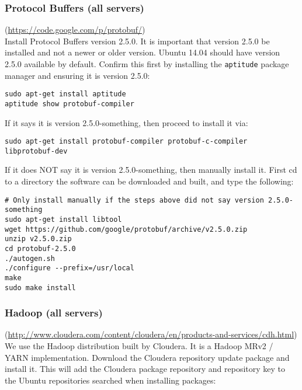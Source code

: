 
\subsubsection{Protocol Buffers (all servers)} (\url{https://code.google.com/p/protobuf/})\\
Install Protocol Buffers version 2.5.0.  It is important that version
2.5.0 be installed and not a newer or older version.  Ubuntu 14.04 should
have version 2.5.0 available by default.  Confirm this first by installing the
\verb|aptitude| package manager and ensuring it is version 2.5.0:

\begin{verbatim}
sudo apt-get install aptitude
aptitude show protobuf-compiler
\end{verbatim}

If it says it is version 2.5.0-something, then proceed to install it via:

\begin{verbatim}
sudo apt-get install protobuf-compiler protobuf-c-compiler libprotobuf-dev
\end{verbatim}

If it does NOT say it is version 2.5.0-something, then manually install
it.  First cd to a directory the software can be downloaded and built,
and type the following:

\begin{verbatim}
# Only install manually if the steps above did not say version 2.5.0-something
sudo apt-get install libtool
wget https://github.com/google/protobuf/archive/v2.5.0.zip
unzip v2.5.0.zip
cd protobuf-2.5.0
./autogen.sh 
./configure --prefix=/usr/local
make
sudo make install
\end{verbatim}


\subsubsection{Hadoop (all servers)} (\url{http://www.cloudera.com/content/cloudera/en/products-and-services/cdh.html})\\
We use the Hadoop distribution built by Cloudera.  It is a Hadoop MRv2 /
YARN implementation.  Download the Cloudera repository update package and
install it.  This will add the Cloudera package repository and repository
key to the Ubuntu repositories searched when installing packages:

